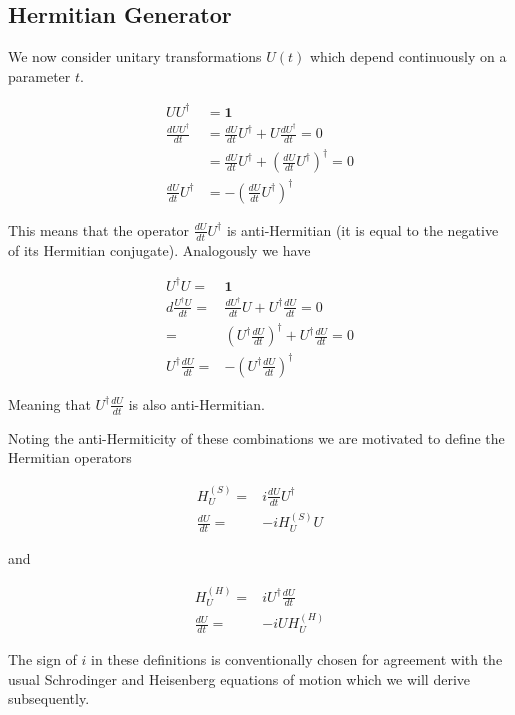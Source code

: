\documentclass[12pt]{article}
\newcommand{\bv}[1]{\boldsymbol{#1}}
\begin{document}
\subsection{Hermitian Generator}

We now consider unitary transformations $U(t)$ which depend continuously on a parameter $t$.

\begin{align}
UU^{\dag} &= \bv{1} \nonumber\\
\frac{dUU^{\dag}}{dt} &= \frac{dU}{dt} U^{\dag} + U\frac{dU^{\dag}}{dt} = 0 \nonumber\\
&= \frac{dU}{dt}U^{\dag} + \left(\frac{dU}{dt}U^{\dag}\right)^{\dag} = 0 \nonumber\\
\frac{dU}{dt}U^{\dag} &= -\left(\frac{dU}{dt}U^{\dag}\right)^{\dag}
\end{align}

This means that the operator $\frac{dU}{dt}U^{\dag}$ is anti-Hermitian (it is equal to the negative of its Hermitian conjugate).
Analogously we have

\begin{align}
U^{\dag}U =& \bv{1} \nonumber\\
d\frac{U^{\dag}U}{dt} =& \frac{dU^{\dag}}{dt}U + U^{\dag}\frac{dU}{dt} = 0 \nonumber \\
=& \left(U^{\dag}\frac{dU}{dt}\right)^{\dag} + U^{\dag}\frac{dU}{dt} = 0 \nonumber\\
U^{\dag}\frac{dU}{dt} =& -\left(U^{\dag}\frac{dU}{dt}\right)^{\dag}
\end{align}

Meaning that $U^{\dag}\frac{dU}{dt}$ is also anti-Hermitian.

Noting the anti-Hermiticity of these combinations we are motivated to define the Hermitian operators

\begin{align}
H_U^{(S)} =& i\frac{dU}{dt}U^{\dag} \nonumber\\
\frac{dU}{dt} =& -i H_U^{(S)} U
\end{align}

and

\begin{align}
H_U^{(H)} =& iU^{\dag}\frac{dU}{dt} \nonumber\\
\frac{dU}{dt} =& -i UH_U^{(H)}
\end{align}

The sign of $i$ in these definitions is conventionally chosen for agreement with the usual Schrodinger and Heisenberg equations of motion which we will derive subsequently.
\end{document}
